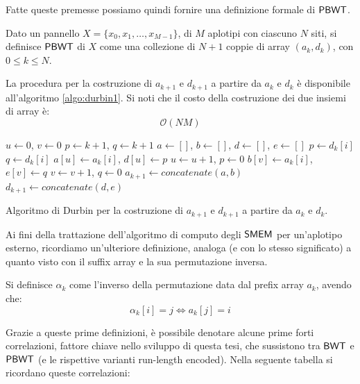 \noindent
Fatte queste premesse possiamo quindi fornire una definizione formale di
$\mbox{\rm {\sf PBWT}}$.
\begin{definizione}
  Dato un pannello $X=\{x_0,x_1,\ldots,x_{M-1}\}$, di $M$ aplotipi con ciascuno
  $N$ siti, si definisce $\mbox{\rm {\sf PBWT}}$ di $X$ come una
  collezione di $N+1$ coppie di array $(a_k,d_k)$, con $0\leq k\leq N$.
\end{definizione}
La procedura per la costruzione di $a_{k+1}$ e $d_{k+1}$ a partire da $a_k$ e
$d_k$ è disponibile all'algoritmo \ref{algo:durbin1}. Si noti che
il costo della costruzione dei due insiemi di array è:
\begin{equation}
  \label{eq:pbwtadtime}
  \mathcal{O}(NM)
\end{equation}
\begin{algorithm}
  \small
  \begin{algorithmic}[1]
    \State $u\gets 0$, $v\gets 0$
    \State $p\gets k+1$, $q\gets k+1$
    \State $a\gets []$, $b\gets []$, $d\gets []$, $e\gets []$
    \State $p\gets d_k[i]$
    \EndIf
    \State $q\gets d_k[i]$
    \EndIf
    \State $a[u]\gets a_k[i]$, $d[u]\gets p$
    \State $u\gets u+1$, $p\gets 0$
    \Else
    \State $b[v]\gets a_k[i]$, $e[v]\gets q$
    \State $v\gets v+1$, $q\gets 0$
    \EndIf
    \EndFor
    \State $a_{k+1}\gets concatenate(a,b)$
    \State $d_{k+1}\gets concatenate(d,e)$ 
    \EndFunction
  \end{algorithmic}
  \caption{Algoritmo di Durbin per la costruzione di $a_{k+1}$ e $d_{k+1}$ a
  partire da $a_{k}$ e $d_{k}$.}
  \label{algo:durbin1}
\end{algorithm}
Ai fini della trattazione dell'algoritmo di computo degli $\mbox{\rm {\sf SMEM}}$ per
un'aplotipo esterno,
ricordiamo un'ulteriore definizione, analoga (e con lo stesso significato)
a quanto visto con il suffix array e la sua permutazione inversa. 
\begin{definizione}
  Si definisce $\alpha_k$ come l'inverso della permutazione data dal
  prefix array $a_k$, avendo che:
  \[\alpha_k[i]=j \iff a_k[j]=i\]
\end{definizione}
Grazie a queste prime definizioni, è possibile denotare alcune prime forti
correlazioni, fattore chiave nello sviluppo di questa tesi, che sussistono tra
$\mbox{\rm {\sf BWT}}$ e $\mbox{\rm {\sf PBWT}}$ (e le rispettive varianti run-length
  encoded). Nella seguente tabella si ricordano queste correlazioni:

